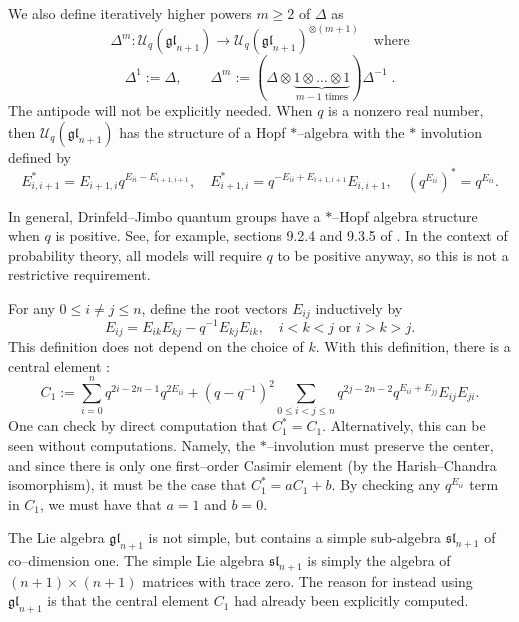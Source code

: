 \documentclass{ximera}
\begin{document}
We also define iteratively higher powers $m \geq 2 $ of $\Delta$ as
\begin{equation*}
    \Delta^{m}: \mathcal{U}_q(\mathfrak{gl}_{n+1}) \to \mathcal{U}_q(\mathfrak{gl}_{n+1})^{\otimes (m+1)}
    \quad \text{where}
\end{equation*}
$$
\Delta^1:=\Delta, \qquad \Delta^m := (\Delta\otimes \underbrace{1\otimes\ldots\otimes 1}_{m-1 \text{ times}}) \Delta^{-1} \;.
$$
The antipode will not be explicitly needed. 
When $q$ is a nonzero real number, then $\mathcal{U}_q(\mathfrak{gl}_{n+1})$ has the structure of a Hopf $*$--algebra with the $*$ involution defined by 
$$
E_{i,i+1}^* = E_{i+1,i}q^{E_{ii}-E_{i+1,i+1}}, \quad E_{i+1,i}^*= q^{-E_{ii}+E_{i+1,i+1}}E_{i,i+1}, \quad (q^{E_{ii}})^* = q^{E_{ii}}.
$$

\begin{remark}\label{CentralExplanation}
In general, Drinfeld--Jimbo quantum groups have a $*$--Hopf algebra structure when $q$ is positive. See, for example, sections 9.2.4 and 9.3.5 of \cite{KSBook}. In the context of probability theory, all models will require $q$ to be positive anyway, so this is not a restrictive requirement.
\end{remark}
For any $0 \leq i \neq j \leq n$, define the root vectors  $E_{ij}$ inductively by 
$$
E_{ij} = E_{ik}E_{kj} - q^{-1}E_{kj}E_{ik}, \quad i <k<j \text{ or } i > k > j.
$$
This definition does not depend on the choice of $k$. With this definition, there is a central element \cite{GZB}:
\begin{equation*}
C_1:=\sum_{i=0}^{n} q^{2 i-2 n-1} q^{2 E_{i i}}+\left(q-q^{-1}\right)^{2} \sum_{0 \leq i<j \leq n} q^{2 j-2 n-2} q^{E_{i i}+E_{j j}} E_{i j} E_{j i}.
\end{equation*}
One can check by direct computation that $C_1^*=C_1$. Alternatively, this can be seen without computations. Namely, the $*$--involution must preserve the center, and since there is only one first--order Casimir element (by the Harish--Chandra isomorphism), it must be the case that $C_1^*=aC_1+b$. By checking any $q^{E_{ii}}$ term in $C_1$, we must have that $a=1$ and $b=0$. 

\begin{remark}
The Lie algebra $\mathfrak{gl}_{n+1}$ is not simple, but contains a simple sub-algebra $\mathfrak{sl}_{n+1}$ of co--dimension one. The simple Lie algebra $\mathfrak{sl}_{n+1}$ is  simply the algebra of $(n+1) \times (n+1)$ matrices with trace zero. The reason for instead using $\mathfrak{gl}_{n+1}$ is that the central element $C_1$ had already been explicitly computed. 
\end{remark}
\end{document}
